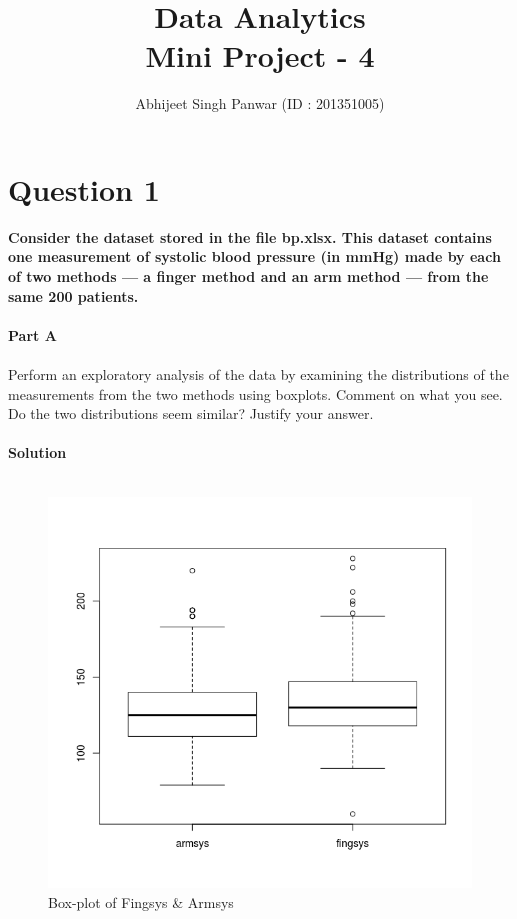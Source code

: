 \documentclass[12pt,a4paper]{report}
\author{Abhijeet Singh Panwar (ID : 201351005)}
\title{Data Analytics\\ Mini Project - 4}
\date{\parbox{\linewidth}{\centering%
  \today\endgraf\bigskip
  Instructor : \endgraf\medskip
  Prof. Bhargab Chattopadhyay\endgraf\bigskip
  Indian Institute of Information Technology, Vadodara}}
\begin{document}
\maketitle
\newpage
\section{Question 1}
\textbf{Consider the dataset stored in the file bp.xlsx. This dataset contains one measurement of systolic blood pressure (in mmHg) made by each of two methods — a finger method and an arm method — from the same
200 patients.}
\\\\
\textbf{Part A}
\\\\
Perform an exploratory analysis of the data by examining the distributions of the measurements from the two methods using boxplots. Comment on what you see. Do the two distributions seem similar? Justify your answer.
\\\\
\textbf{Solution}
\\\\
\begin{figure}[h]
\begin{center}
\includegraphics[scale=0.5]{plot.png}
\caption{Box-plot of Fingsys \& Armsys}
\end{center}
\end{figure}
\end{document}
